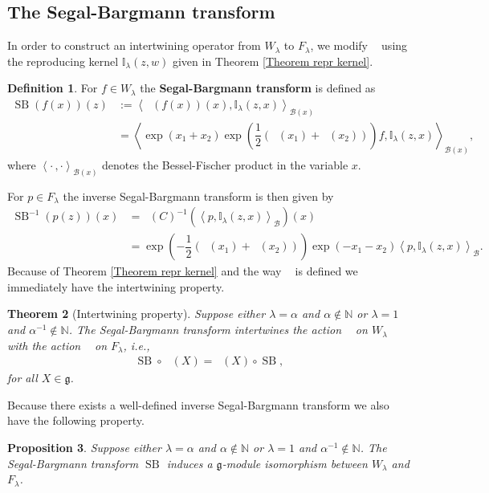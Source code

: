 \documentclass{amsart}
\newtheorem{theorem}{Theorem}
\newtheorem{Prop}[theorem]{Proposition}
\numberwithin{theorem}{section}
\theoremstyle{definition}
\newtheorem{Def}[theorem]{Definition}
\theoremstyle{remark}
\def\N{\mathds{N} }
\DeclareMathOperator{\bessel}{\mathcal B_\lambda}
\DeclareMathOperator{\SB}{\pil(C)}
\newcommand{\iSB}{\pil(C)^{-1}}
\DeclareMathOperator{\rSB}{SB}
\newcommand{\irSB}{\rSB^{-1}}
\newcommand{\bfip}[1]{\left<{#1}\right>_\mathcal B}
\newcommand{\bfipx}[1]{\left<{#1}\right>_{\mathcal B(x)}}
\newcommand{\mf}[1]{\mathfrak{#1}}
\newcommand{\ds}[1]{\mathds{#1}}
\DeclareMathOperator{\pil}{\pi_\lambda}
\DeclareMathOperator{\rol}{\rho_\lambda}
\begin{document}
\endgroup
\subsection{The Segal-Bargmann transform}\label{Segal-Bargmann transform}

In order to construct an intertwining operator from $W_\lambda$ to $F_\lambda$, we modify $\SB$ using the reproducing kernel $\ds I_\lambda(z,w)$ given in Theorem \ref{Theorem repr kernel}.

\begin{Def}\label{Def SB}
 For $f\in W_\lambda$ the \textbf{Segal-Bargmann transform} is defined as
\begin{align*}
\rSB (f(x))(z) &:= \bfipx{\SB(f(x))(x), \ds I_\lambda(z,x)}\\
&= \bfipx{\exp(x_1+x_2)\exp(\dfrac{1}{2}(\bessel(x_1)+\bessel(x_2)))f,\ds I_\lambda(z,x)},
\end{align*}
where $\bfipx{\cdot\, , \cdot}$ denotes the Bessel-Fischer product in the variable $x$.
\end{Def}

For $p\in F_\lambda$ the inverse Segal-Bargmann transform is then given by
\begin{align*}
\irSB (p(z))(x) &= \iSB(\bfip{p, \ds I_\lambda(z,x)})(x)\\
&= \exp(-\dfrac{1}{2}(\bessel(x_1)+\bessel(x_2)))\exp(-x_1-x_2)\bfip{p,\ds I_\lambda(z,x)}.
\end{align*}
Because of Theorem \ref{Theorem repr kernel} and the way $\SB$ is defined we immediately have the intertwining property.

\begin{theorem}[Intertwining property]\label{ThIP}
Suppose either $\lambda=\alpha$ and $\alpha\not\in \N$ or $\lambda=1$ and $\alpha^{-1}\not\in \N$. The Segal-Bargmann transform intertwines the action $\pil$ on $W_\lambda$ with the action $\rol$ on $F_\lambda$, i.e.,
\begin{align*}
\rSB\circ\, \pil(X) = \rol(X)\circ \rSB,
\end{align*}
for all $X\in \mathfrak{g}$.
\end{theorem}

Because there exists a well-defined inverse Segal-Bargmann transform we also have the following property.

\begin{Prop} \label{Prop inverse SB transform}
Suppose either $\lambda=\alpha$ and $\alpha\not\in \N$ or $\lambda=1$ and $\alpha^{-1}\not\in \N$. The Segal-Bargmann transform $\rSB$ induces a $\mf g$-module isomorphism between $W_\lambda$ and $F_\lambda$.
\end{Prop}
\end{document}
